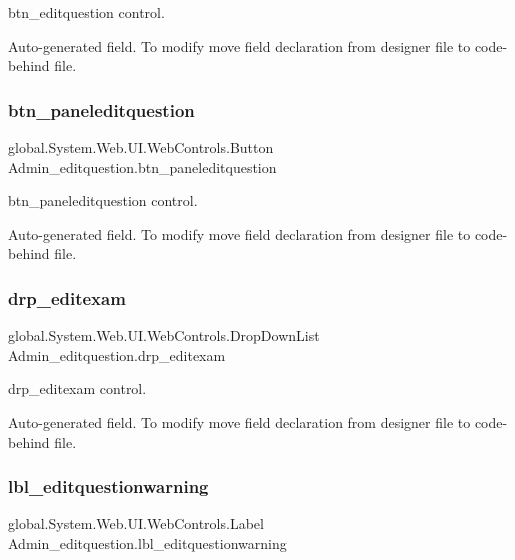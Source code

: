 btn\+\_\+editquestion control. 

Auto-\/generated field. To modify move field declaration from designer file to code-\/behind file. \mbox{\label{class_admin__editquestion_aafd51bc386c07fa3a8ead03a290029e1}} 
\subsubsection{\texorpdfstring{btn\_paneleditquestion}{btn\_paneleditquestion}}
{\footnotesize\ttfamily global.\+System.\+Web.\+U\+I.\+Web\+Controls.\+Button Admin\+\_\+editquestion.\+btn\+\_\+paneleditquestion\hspace{0.3cm}{\ttfamily [protected]}}



btn\+\_\+paneleditquestion control. 

Auto-\/generated field. To modify move field declaration from designer file to code-\/behind file. \mbox{\label{class_admin__editquestion_a43127ac3fecd9c97674566121f157521}} 
\subsubsection{\texorpdfstring{drp\_editexam}{drp\_editexam}}
{\footnotesize\ttfamily global.\+System.\+Web.\+U\+I.\+Web\+Controls.\+Drop\+Down\+List Admin\+\_\+editquestion.\+drp\+\_\+editexam\hspace{0.3cm}{\ttfamily [protected]}}



drp\+\_\+editexam control. 

Auto-\/generated field. To modify move field declaration from designer file to code-\/behind file. \mbox{\label{class_admin__editquestion_a383ed071f0da10f6a609017be49932c7}} 
\subsubsection{\texorpdfstring{lbl\_editquestionwarning}{lbl\_editquestionwarning}}
{\footnotesize\ttfamily global.\+System.\+Web.\+U\+I.\+Web\+Controls.\+Label Admin\+\_\+editquestion.\+lbl\+\_\+editquestionwarning\hspace{0.3cm}{\ttfamily [protected]}}



